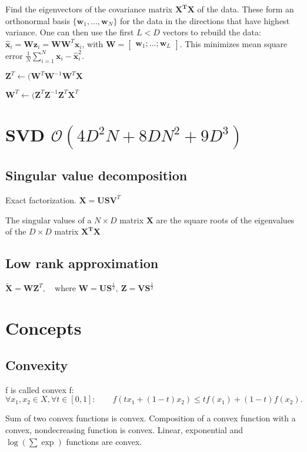 \documentclass[10pt,a4paper,landscape]{article}
\renewcommand{\bf}[1]{\ensuremath{\mathbf{#1}}}
\begin{document}
\begin{multicols*}{4}
Find the eigenvectors of the covariance matrix $\bf{X^T X}$ of the data. These form an orthonormal basis $\{ \bf{w}_1, ..., \bf{w}_N\}$ for the data in the directions that have highest variance.
One can then use the first $L < D$ vectors to rebuild the data: $\bf{\hat{x}}_i = \bf{W} \bf{z}_i = \bf{W} \bf{W}^T \bf{x}_i$, with $\bf{W} = \begin{bmatrix} \bf{w}_1 ; ... ; \bf{w}_L \end{bmatrix}$.
This minimizes mean square error $\frac{1}{N} \sum_{i=1}^N \bf{x}_i - \bf{\hat{x}}_i^2$.


$\bf{Z}^T \leftarrow (\bf{W}^T\bf{W}^{-1}\bf{W}^T\bf{X}$


$\bf{W}^T \leftarrow (\bf{Z}^T\bf{Z}^{-1}\bf{Z}^T\bf{X}^T$

\section{SVD \small$\mathcal{O}(4D^2N+8DN^2+9D^3)$}
\subsection{Singular value decomposition}
Exact factorization.
$\bf{X} = \bf{USV}^T$

The singular values of a $N \times D$ matrix $\bf{X}$ are the square roots of the eigenvalues of the $D \times D$ matrix $\bf{X^T X}$

\subsection{Low rank approximation}
$\tilde{\bf{X}} = \bf{WZ}^T, \quad \text{where }\bf{W} = \bf{US}^{\frac{1}{2}},\: \bf{Z}=\bf{VS}^{\frac{1}{2}}$
\section{Concepts}

\subsection{Convexity}
f is called convex f: $\forall x_1, x_2 \in X, \forall t \in [0, 1]: \qquad f(tx_1+(1-t)x_2)\leq t f(x_1)+(1-t)f(x_2).$

Sum of two convex functions is convex. Composition of a convex function with a convex, nondecreasing function is convex. Linear, exponential and $\log(\sum \exp)$ functions are convex.


\end{multicols*}
\end{document}
